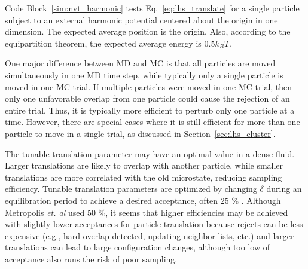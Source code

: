 \begin{figure}

\end{figure}

Code Block~\ref{sim:nvt_harmonic} tests Eq.~\ref{eq:lhs_translate} for a single particle subject to an external harmonic potential centered about the origin in one dimension.
The expected average position is the origin.
Also, according to the equipartition theorem, the expected average energy is $0.5k_BT$.

One major difference between MD and MC is that all particles are moved simultaneously in one MD time step, while typically only a single particle is moved in one MC trial.
If multiple particles were moved in one MC trial, then only one unfavorable overlap from one particle could cause the rejection of an entire trial.
Thus, it is typically more efficient to perturb only one particle at a time.
However, there are special cases where it is still efficient for more than one particle to move in a single trial, as discussed in Section~\ref{sec:lhs_cluster}.

The tunable translation parameter may have an optimal value in a dense fluid.
Larger translations are likely to overlap with another particle, while smaller translations are more correlated with the old microstate, reducing sampling efficiency.
Tunable translation parameters are optimized by changing $\delta$ during an equilibration period to achieve a desired acceptance, often $25$ $\%$ \cite{kolafa_optimization_1987, jacucci_comparing_1984, chapman_metropolis_1985, mountain_quantative_1994, hatch_parallel_2020}.
Although Metropolis \textit{et. al} \cite{metropolis_equation_1953} used 50 \%, it seems that higher efficiencies may be achieved with slightly lower acceptances for particle translation because rejects can be less expensive (e.g., hard overlap detected, updating neighbor lists, etc.) and larger translations can lead to large configuration changes, although too low of acceptance also runs the risk of poor sampling.

